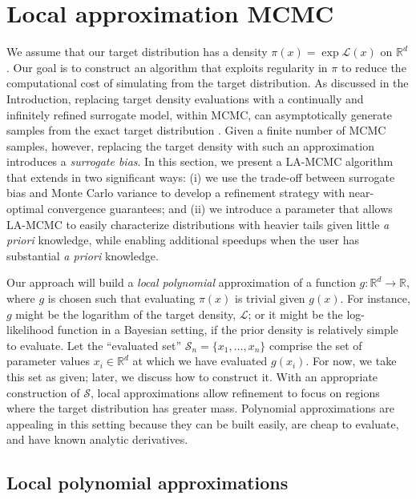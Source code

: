 \section{Local approximation MCMC}
\label{sec:numerics}

We assume that our target distribution has a density $\pi(x) = \exp{\mathcal{L}(x)}$ on $\mathbb{R}^d$. Our goal is to construct an algorithm that exploits regularity in $\pi$ to reduce the computational cost of simulating from the target distribution. As discussed in the Introduction, replacing target density evaluations with a continually and infinitely refined surrogate model, within MCMC, can asymptotically generate samples from the exact target distribution \citep{Conradetal2016}. Given a finite number of MCMC samples, however, replacing the target density with such an approximation introduces a \textit{surrogate bias}. In this section, we present a LA-MCMC algorithm that extends \citet{Conradetal2016} in two significant ways: (i) we use the trade-off between surrogate bias and Monte Carlo variance to develop a refinement strategy with near-optimal convergence guarantees; and (ii) we introduce a parameter that allows LA-MCMC to easily characterize distributions with heavier tails given little \textit{a priori} knowledge, while enabling additional speedups when the user has substantial \textit{a priori} knowledge.

Our approach will build a \textit{local polynomial} approximation \citep{Connetal2009,Kohler2002,Stone1977} of a function $g:\mathbb{R}^{d} \to \mathbb{R}$, where $g$ is chosen such that evaluating $\pi(x)$ is trivial given $g(x)$. For instance, $g$ might be the logarithm of the target density, $\mathcal{L}$; or it might be the log-likelihood function in a Bayesian setting, if the prior density is relatively simple to evaluate. Let the ``evaluated set'' $\mathcal{S}_n = \{x_1, \hdots, x_n\}$ comprise the set of parameter values $x_i \in \mathbb{R}^d$ at which we have evaluated $g(x_i)$. For now, we take this set as given; later, we discuss how to construct it. With an appropriate construction of $\mathcal{S}$, local approximations allow refinement to focus on regions where the target distribution has greater mass. Polynomial approximations are appealing in this setting because they can be built easily, are cheap to evaluate, and have known analytic derivatives.

\subsection{Local polynomial approximations}

